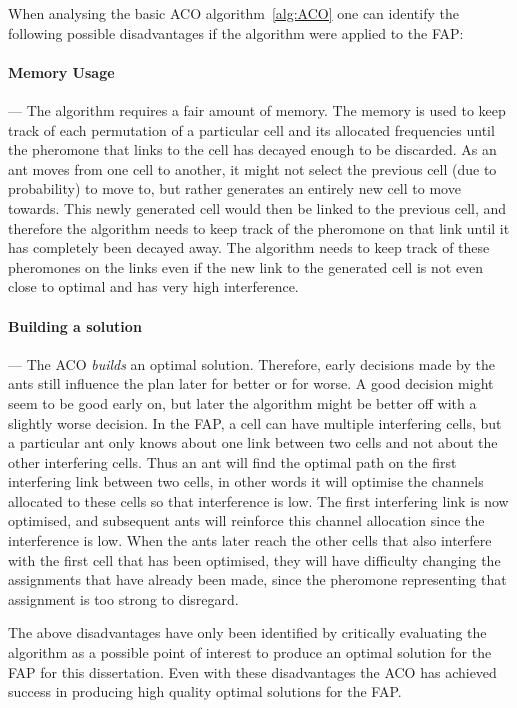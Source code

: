 When analysing the basic \gls{ACO} algorithm~\ref{alg:ACO} one can identify the following possible disadvantages if the algorithm were applied to the \gls{FAP}:
\paragraph{Memory Usage}
--- The algorithm requires a fair amount of memory. The memory is used to keep track of each permutation of a particular cell and its allocated frequencies until the pheromone that links to the cell has decayed enough to be discarded. As an ant moves from one cell to another, it might not select the previous cell (due to probability) to move to, but rather generates an entirely new cell to move towards. This newly generated cell would then be linked to the previous cell, and therefore the algorithm needs to keep track of the pheromone on that link until it has completely been decayed away. The algorithm needs to keep track of these pheromones on the links even if the new link to the generated cell is not even close to optimal and has very high interference.
\paragraph{Building a solution}
--- The \gls{ACO} \emph{builds} an optimal solution. Therefore, early decisions made by the ants still influence the plan later for better or for worse. A good decision might seem to be good early on, but later the algorithm might be better off with a slightly worse decision. In the \gls{FAP}, a cell can have multiple interfering cells, but a particular ant only knows about one link between two cells and not about the other interfering cells. Thus an ant will find the optimal path on the first interfering link between two cells, in other words it will optimise the channels allocated to these cells so that interference is low. The first interfering link is now optimised, and subsequent ants will reinforce this channel allocation since the interference is low. When the ants later reach the other cells that also interfere with the first cell that has been optimised, they will have difficulty changing the assignments that have already been made, since the pheromone representing that assignment is too strong to disregard.

The above disadvantages have only been identified by critically evaluating the algorithm as a possible point of interest to produce an optimal solution for the \gls{FAP} for this dissertation. Even with these disadvantages the \gls{ACO} has achieved success in producing high quality optimal solutions for the \gls{FAP}.

